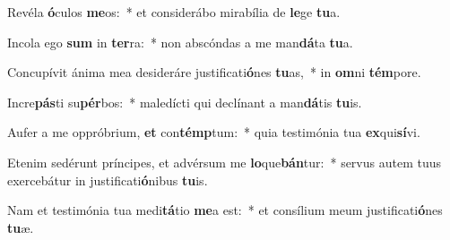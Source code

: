 \item Revéla \textbf{ó}culos \textbf{me}os:~* et considerábo mirabília de \textbf{le}ge \textbf{tu}a.
\item Incola ego \textbf{sum} in \textbf{ter}ra:~* non abscóndas a me man\textbf{dá}ta \textbf{tu}a.
\item Concupívit ánima mea desideráre justificati\textbf{ó}nes \textbf{tu}as,~* in \textbf{om}ni \textbf{tém}pore.
\item Incre\textbf{pás}ti su\textbf{pér}bos:~* maledícti qui declínant a man\textbf{dá}tis \textbf{tu}is.
\item Aufer a me oppróbrium, \textbf{et} con\textbf{témp}tum:~* quia testimónia tua \textbf{ex}qui\textbf{sí}vi.
\item Etenim sedérunt príncipes, et advérsum me \textbf{lo}que\textbf{bán}tur:~* servus autem tuus exercebátur in justificati\textbf{ó}nibus \textbf{tu}is.
\item Nam et testimónia tua medi\textbf{tá}tio \textbf{me}a est:~* et consílium meum justificati\textbf{ó}nes \textbf{tu}æ.
